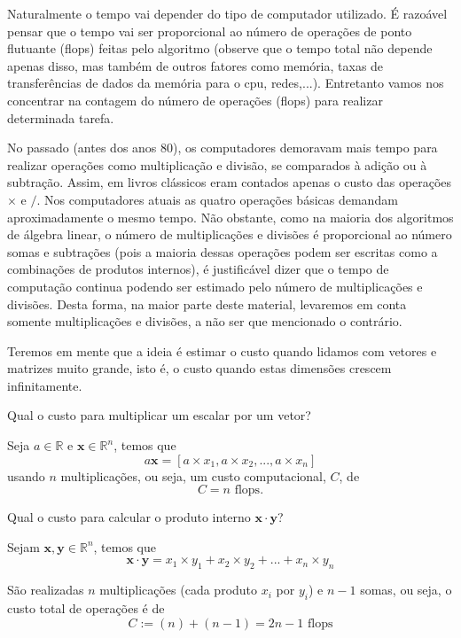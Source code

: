 Naturalmente o tempo vai depender do tipo de computador utilizado. É razoável pensar que o tempo vai ser proporcional ao número de operações de ponto flutuante (flops) feitas pelo algoritmo (observe que o tempo total não depende apenas disso, mas também de outros fatores como memória, taxas de transferências de dados da memória para o cpu, redes,...). Entretanto vamos nos concentrar na contagem do número de operações (flops) para realizar determinada tarefa.

No passado (antes dos anos 80), os computadores demoravam mais tempo para realizar operações como multiplicação e divisão, se comparados à adição ou à subtração. Assim, em livros clássicos eram contados apenas o custo das operações $\times$ e $/$. Nos computadores atuais as quatro operações básicas demandam aproximadamente o mesmo tempo. Não obstante, como na maioria dos algoritmos de álgebra linear, o número de multiplicações e divisões é proporcional ao número somas e subtrações (pois a maioria dessas operações podem ser escritas como a combinações de produtos internos), é justificável dizer que o tempo de computação continua podendo ser estimado pelo número de multiplicações e divisões. Desta forma, na maior parte deste material, levaremos em conta somente multiplicações e divisões, a não ser que mencionado o contrário.

Teremos em mente que a ideia é estimar o custo quando lidamos com vetores e matrizes muito grande, isto é, o custo quando estas dimensões crescem infinitamente.

\begin{ex}
Qual o custo para multiplicar um escalar por um vetor?
\end{ex}
\begin{sol}
Seja $a \in \mathbb{R}$ e $\pmb{x} \in \mathbb{R}^n$, temos que
\begin{equation}
  a \pmb{x} = [a\times x_1 , a\times x_2 , ... ,a\times x_n]
\end{equation}
usando $n$ multiplicações, ou seja, um custo computacional, $C$, de
\begin{equation}
  C = n \text{~flops}.
\end{equation}
\end{sol}

\begin{ex}
Qual o custo para calcular o produto interno $\pmb{x}\cdot\pmb{y}$?
\end{ex}
\begin{sol}
Sejam $\pmb{x}, \pmb{y} \in \mathbb{R}^n$, temos que
\begin{equation}
  \pmb{x}\cdot\pmb{y} = x_1 \times y_1 + x_2\times y_2 + ... +x_n\times y_n
\end{equation}

São realizadas $n$ multiplicações (cada produto $x_i$ por $y_i$) e $n-1$ somas, ou seja, o custo total de operações é de
\begin{equation}
  C := (n)+(n-1) = 2n-1 \text{~flops}
\end{equation}
\end{sol}


